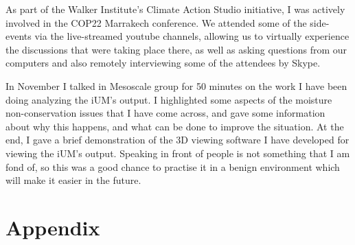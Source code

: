 \documentclass[11pt,a4paper]{article}
\newcommand{\todo}{TODO: \texttt}
\begin{document}
As part of the Walker Institute's Climate Action Studio initiative, I was actively involved in the COP22 Marrakech conference.  We attended some of the side-events via the live-streamed youtube channels, allowing us to virtually experience the discussions that were taking place there, as well as asking questions from our computers and also remotely interviewing some of the attendees by Skype. %

In November I talked in Mesoscale group for 50 minutes on the work I have been doing analyzing the iUM's output. I highlighted some aspects of the moisture non-conservation issues that I have come across, and gave some information about why this happens, and what can be done to improve the situation. At the end, I gave a brief demonstration of the 3D viewing software I have developed for viewing the iUM's output. Speaking in front of people is not something that I am fond of, so this was a good chance to practise it in a benign environment which will make it easier in the future.

\printbibliography[title={References}]

\newpage
\section*{Appendix}
\end{document}
